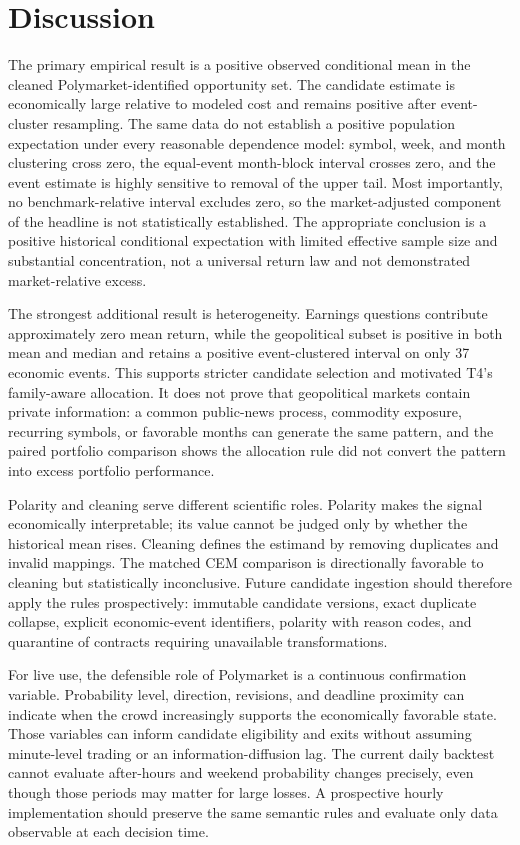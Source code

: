 \documentclass[sigconf,anonymous]{acmart}
\begin{document}


\section{Discussion}

The primary empirical result is a positive observed conditional mean in the cleaned Polymarket-identified opportunity set. The candidate estimate is economically large relative to modeled cost and remains positive after event-cluster resampling. The same data do not establish a positive population expectation under every reasonable dependence model: symbol, week, and month clustering cross zero, the equal-event month-block interval crosses zero, and the event estimate is highly sensitive to removal of the upper tail. Most importantly, no benchmark-relative interval excludes zero, so the market-adjusted component of the headline is not statistically established. The appropriate conclusion is a positive historical conditional expectation with limited effective sample size and substantial concentration, not a universal return law and not demonstrated market-relative excess.

The strongest additional result is heterogeneity. Earnings questions contribute approximately zero mean return, while the geopolitical subset is positive in both mean and median and retains a positive event-clustered interval on only 37 economic events. This supports stricter candidate selection and motivated T4's family-aware allocation. It does not prove that geopolitical markets contain private information: a common public-news process, commodity exposure, recurring symbols, or favorable months can generate the same pattern, and the paired portfolio comparison shows the allocation rule did not convert the pattern into excess portfolio performance.

Polarity and cleaning serve different scientific roles. Polarity makes the signal economically interpretable; its value cannot be judged only by whether the historical mean rises. Cleaning defines the estimand by removing duplicates and invalid mappings. The matched CEM comparison is directionally favorable to cleaning but statistically inconclusive. Future candidate ingestion should therefore apply the rules prospectively: immutable candidate versions, exact duplicate collapse, explicit economic-event identifiers, polarity with reason codes, and quarantine of contracts requiring unavailable transformations.

For live use, the defensible role of Polymarket is a continuous confirmation variable. Probability level, direction, revisions, and deadline proximity can indicate when the crowd increasingly supports the economically favorable state. Those variables can inform candidate eligibility and exits without assuming minute-level trading or an information-diffusion lag. The current daily backtest cannot evaluate after-hours and weekend probability changes precisely, even though those periods may matter for large losses. A prospective hourly implementation should preserve the same semantic rules and evaluate only data observable at each decision time.
\end{document}
